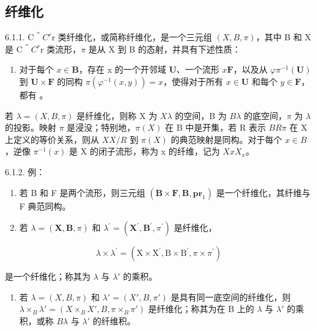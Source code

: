 \subsection{纤维化}

6.1.1. C＾\(C^{r}\)r 类纤维化，或简称纤维化，是一个三元组 \((X, B, \pi)\)，其中 B 和 X 是 C＾\(C^{r}\)r 类流形，\(\pi\) 是从 X 到 B 的态射，并具有下述性质：

\begin{enumerate}
\def\labelenumi{(\Alph{enumi})}
\setcounter{enumi}{5}
\tightlist
\item
  对于每个 \(x \in \mathbf{B}\)，存在 x 的一个开邻域 \(\mathbf{U}\)、一个流形 \(x\)\(\mathbf{F}\)，以及从 \(\varphi\)\(\pi^{-1}(\mathbf{U})\) 到 \(\mathbf{U} \times \mathbf{F}\) 的同构 \(\pi(\varphi^{-1}(x, y)) = x\)，使得对于所有 \(x \in \mathbf{U}\) 和每个 \(y \in \mathbf{F}\)，都有 。
\end{enumerate}

若 \(\lambda = (X, B, \pi)\) 是纤维化，则称 X 为 \(X\)\(\lambda\) 的空间，B 为 \(B\)\(\lambda\) 的底空间，\(\pi\) 为 \(\lambda\) 的投影。映射 \(\pi\) 是浸没；特别地，\(\pi(X)\) 在 B 中是开集，若 R 表示 \(B\)\(R\)\(\pi\) 在 X 上定义的等价关系，则从 \(X\)\(X/R\) 到 \(\pi(X)\) 的典范映射是同构。对于每个 \(x \in B\)，逆像 \(\pi^{-1}(x)\) 是 X 的闭子流形，称为 x 的纤维，记为 \(X\)\(x\)\(X_x\)。

6.1.2. 例：

\begin{enumerate}
\def\labelenumi{(\alph{enumi})}
\item
  若 B 和 F 是两个流形，则三元组 \((\mathbf{B} \times \mathbf{F}, \mathbf{B}, \mathbf{pr}_{1})\) 是一个纤维化，其纤维与 F 典范同构。
\item
  若 \(\lambda = (\mathbf{X},\mathbf{B},\pi)\) 和 \(\lambda^{\prime} = (\mathbf{X}^{\prime},\mathbf{B}^{\prime},\pi^{\prime})\) 是纤维化，
\end{enumerate}

\[
\lambda \times \lambda^ {\prime} = (\mathrm{X} \times \mathrm{X} ^ {\prime}, \mathrm{B} \times \mathrm{B} ^ {\prime}, \pi \times \pi^ {\prime})
\]

是一个纤维化；称其为 \(\lambda\) 与 \(\lambda'\) 的乘积。

\begin{enumerate}
\def\labelenumi{(\alph{enumi})}
\setcounter{enumi}{2}
\tightlist
\item
  若 \(\lambda = (X, B, \pi)\) 和 \(\lambda' = (X', B, \pi')\) 是具有同一底空间的纤维化，则 \(\lambda \times_{B} \lambda' = (X \times_{B} X', B, \pi \times_{B} \pi')\) 是纤维化；称其为在 B 上的 \(\lambda\) 与 \(\lambda'\) 的乘积，或称 \(B\)\(\lambda\) 与 \(\lambda'\) 的纤维积。
\end{enumerate}

